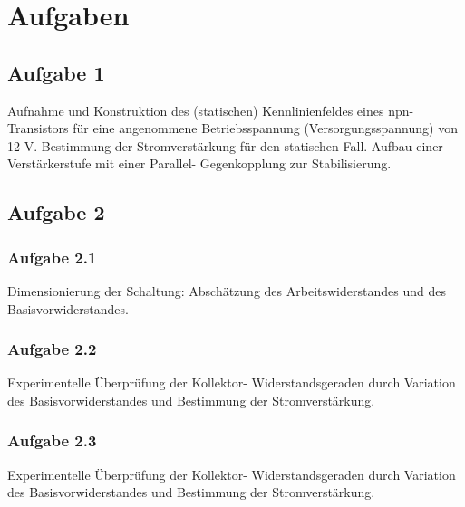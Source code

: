 \documentclass{article}
\begin{document}
\newpage
\section{Aufgaben}
\subsection*{Aufgabe 1}
Aufnahme und Konstruktion des (statischen) Kennlinienfeldes eines npn-Transistors für eine
angenommene Betriebsspannung (Versorgungsspannung) von 12 V. Bestimmung der Stromverstärkung für
den statischen Fall. Aufbau einer Verstärkerstufe mit einer Parallel- Gegenkopplung zur
Stabilisierung.

\subsection*{Aufgabe 2}
\subsubsection*{Aufgabe 2.1}
Dimensionierung der Schaltung: Abschätzung des Arbeitswiderstandes und des Basisvorwiderstandes.
\subsubsection*{Aufgabe 2.2}
Experimentelle Überprüfung der Kollektor- Widerstandsgeraden durch Variation des
Basisvorwiderstandes und Bestimmung der Stromverstärkung.
\subsubsection*{Aufgabe 2.3}
Experimentelle Überprüfung der Kollektor- Widerstandsgeraden durch Variation des
Basisvorwiderstandes und Bestimmung der Stromverstärkung.

\begin{center}
\begin{minipage}{\linewidth}
\centering
{}
%
\label{Schaltplan1}
\end{minipage}
\end{center}
\end{document}
